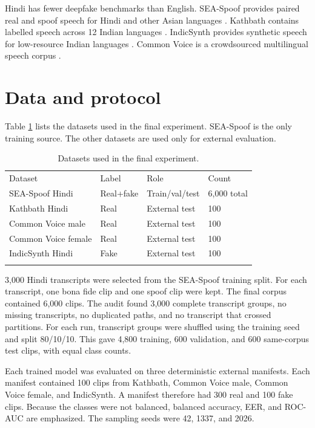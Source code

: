 \documentclass[3p,times,procedia]{elsarticle}
\begin{document}
Hindi has fewer deepfake benchmarks than English. SEA-Spoof provides paired
real and spoof speech for Hindi and other Asian languages
\cite{wu2025seaspoof}. Kathbath contains labelled speech across 12 Indian
languages \cite{javed2022indicsuperb}. IndicSynth provides synthetic speech
for low-resource Indian languages \cite{sharma2025indicsynth}. Common Voice
is a crowdsourced multilingual speech corpus \cite{ardila2020commonvoice}.

\section{Data and protocol}
Table \ref{tab:data} lists the datasets used in the final experiment.
SEA-Spoof is the only training source. The other datasets are used only for
external evaluation.

\begin{table}[h]
\caption{Datasets used in the final experiment.}
\label{tab:data}
\begin{tabular*}{\hsize}{@{\extracolsep{\fill}}llll@{}}
\toprule
Dataset & Label & Role & Count \\
\colrule
SEA-Spoof Hindi & Real+fake & Train/val/test & 6,000 total \\
Kathbath Hindi & Real & External test & 100 \\
Common Voice male & Real & External test & 100 \\
Common Voice female & Real & External test & 100 \\
IndicSynth Hindi & Fake & External test & 100 \\
\botrule
\end{tabular*}
\end{table}

3,000 Hindi transcripts were selected from the SEA-Spoof training split. For
each transcript, one bona fide clip and one spoof clip were kept. The final
corpus contained 6,000 clips. The audit found 3,000 complete transcript
groups, no missing transcripts, no duplicated paths, and no transcript that
crossed partitions. For each run, transcript groups were shuffled using the
training seed and split 80/10/10. This gave 4,800 training, 600 validation,
and 600 same-corpus test clips, with equal class counts.

Each trained model was evaluated on three deterministic external manifests.
Each manifest contained 100 clips from Kathbath, Common Voice male, Common
Voice female, and IndicSynth. A manifest therefore had 300 real and 100 fake
clips. Because the classes were not balanced, balanced
accuracy, EER, and ROC-AUC are emphasized. The sampling seeds were 42, 1337, and 2026.
\end{document}
